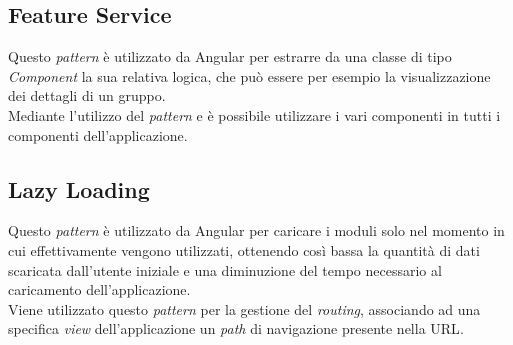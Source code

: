 \subsection{Feature Service}
Questo \textit{pattern} è utilizzato da Angular per estrarre da una classe di tipo \textit{Component} la sua relativa logica, che può essere per esempio la visualizzazione dei dettagli di un gruppo.\\
 Mediante l'utilizzo del \textit{pattern}  e  è possibile utilizzare i vari componenti in tutti i componenti dell'applicazione.
\subsection{Lazy Loading}
Questo \textit{pattern} è utilizzato da Angular per caricare i moduli solo nel momento in cui effettivamente vengono utilizzati, ottenendo così bassa la quantità di dati scaricata dall'utente iniziale e una diminuzione del tempo necessario al caricamento dell'applicazione.\\
Viene utilizzato questo \textit{pattern} per la gestione del \textit{routing}, associando ad una specifica \textit{view} dell'applicazione un \textit{path} di navigazione presente nella \gls{URL}.



